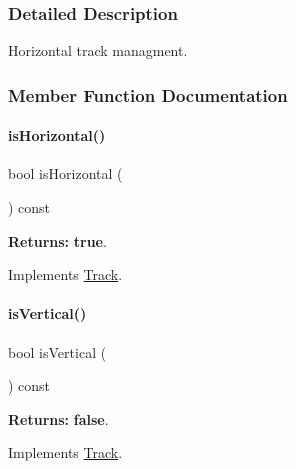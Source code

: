 \subsubsection{Detailed Description}
Horizontal track managment. 

\subsubsection{Member Function Documentation}
\mbox{\label{classKite_1_1HorizontalTrack_a21b9cefd33ae22e4c2070ad441bdd30b}} 
\paragraph{\texorpdfstring{is\+Horizontal()}{isHorizontal()}}
{\footnotesize\ttfamily bool is\+Horizontal (\begin{DoxyParamCaption}{ }\end{DoxyParamCaption}) const\hspace{0.3cm}{\ttfamily [virtual]}}

{\bfseries Returns\+:} {\bfseries true}. 

Implements \hyperlink{classKite_1_1Track_a9d3db1f8a5aca58f8f54d291faebf873}{Track}.

\mbox{\label{classKite_1_1HorizontalTrack_abd54544ef1710ee4b67cfb021d73446c}} 
\paragraph{\texorpdfstring{is\+Vertical()}{isVertical()}}
{\footnotesize\ttfamily bool is\+Vertical (\begin{DoxyParamCaption}{ }\end{DoxyParamCaption}) const\hspace{0.3cm}{\ttfamily [virtual]}}

{\bfseries Returns\+:} {\bfseries false}. 

Implements \hyperlink{classKite_1_1Track_a6fa2bf0568a2b295dd7cd1f7207247d5}{Track}.

